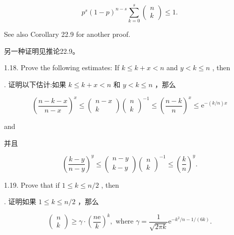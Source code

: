 \documentclass[10pt]{article}
\begin{document}
\[
{p}^{s}{\left( 1 - p\right) }^{n - s}\mathop{\sum }\limits_{{k = 0}}^{s}\left( \begin{array}{l} n \\  k \end{array}\right)  \leq  1.
\]

See also Corollary 22.9 for another proof.

\begin{tcolorbox}\relax
另一种证明见推论22.9。
\end{tcolorbox}

1.18. Prove the following estimates: If \(k \leq  k + x < n\) and \(y < k \leq  n\) , then

\begin{tcolorbox}. 证明以下估计:如果 \(k \leq  k + x < n\) 和 \(y < k \leq  n\) ，那么
\end{tcolorbox}

\[
{\left( \frac{n - k - x}{n - x}\right) }^{x} \leq  \left( \begin{matrix} n - x \\  k \end{matrix}\right) {\left( \begin{array}{l} n \\  k \end{array}\right) }^{-1} \leq  {\left( \frac{n - k}{n}\right) }^{x} \leq  {\mathrm{e}}^{-\left( {k/n}\right) x} \tag{1.23}
\]

and

\begin{tcolorbox}\relax
并且
\end{tcolorbox}

\[
{\left( \frac{k - y}{n - y}\right) }^{y} \leq  \left( \begin{array}{l} n - y \\  k - y \end{array}\right) {\left( \begin{array}{l} n \\  k \end{array}\right) }^{-1} \leq  {\left( \frac{k}{n}\right) }^{y}.
\]

1.19. Prove that if \(1 \leq  k \leq  n/2\) , then

\begin{tcolorbox}. 证明如果 \(1 \leq  k \leq  n/2\) ，那么
\end{tcolorbox}

\[
\left( \begin{array}{l} n \\  k \end{array}\right)  \geq  \gamma  \cdot  {\left( \frac{n\mathrm{e}}{k}\right) }^{k},\text{ where }\gamma  = \frac{1}{\sqrt{2\pi k}}{\mathrm{e}}^{-{k}^{2}/n - 1/\left( {6k}\right) }. \tag{1.24}
\]
\end{document}
